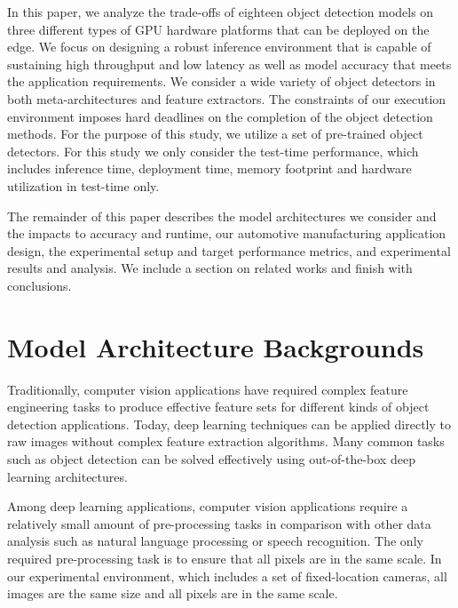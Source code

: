 \documentclass[conference]{IEEEtran}
\newcommand{\alnote}[1]{ {\textcolor{blue} { ***andre: #1 }}}
\newcommand{\alnote}[1]{}
\begin{document}
In this paper, we analyze the trade-offs of eighteen object detection models on three different types of GPU hardware platforms that can be deployed on the edge.
We focus on designing a robust inference environment that is capable of sustaining high throughput and low latency as well as model accuracy that meets the application requirements. 
We consider a wide variety of object detectors in both meta-architectures and feature extractors.  The constraints of our execution environment imposes hard deadlines on the completion of the object detection methods.
For the purpose of this study, we utilize a set of pre-trained object detectors. 
For this study we only consider the test-time performance, which includes inference time, deployment time, memory footprint and hardware utilization in test-time only.


The remainder of this paper describes the model architectures we consider and the impacts to accuracy and runtime, our automotive manufacturing application design, the experimental setup and target performance metrics, and experimental results and analysis.  We include a section on related works and finish with conclusions.


\section{Model Architecture Backgrounds}


Traditionally, computer vision applications have required complex feature engineering tasks to produce effective feature sets for different kinds of object detection applications. 
Today, deep learning techniques can be applied directly to raw images without complex feature extraction algorithms. Many common tasks such as object detection can be solved effectively using out-of-the-box deep learning architectures.

Among deep learning applications, computer vision applications require a relatively small amount of pre-processing tasks in comparison with other data analysis  such as natural language processing or speech recognition. 
The only required pre-processing task is to ensure that all pixels are in the same scale. 
In our experimental environment, which includes a set of fixed-location cameras, all images are the same size and all pixels are in the same scale.
\end{document}
